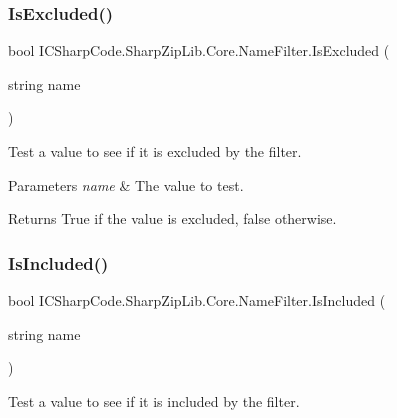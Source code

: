 \subsubsection{\texorpdfstring{Is\+Excluded()}{IsExcluded()}}
{\footnotesize\ttfamily bool I\+C\+Sharp\+Code.\+Sharp\+Zip\+Lib.\+Core.\+Name\+Filter.\+Is\+Excluded (\begin{DoxyParamCaption}\item[{string}]{name }\end{DoxyParamCaption})\hspace{0.3cm}{\ttfamily [inline]}}



Test a value to see if it is excluded by the filter. 


\begin{DoxyParams}{Parameters}
{\em name} & The value to test.\\
\hline
\end{DoxyParams}
\begin{DoxyReturn}{Returns}
True if the value is excluded, false otherwise.
\end{DoxyReturn}
\mbox{\label{class_i_c_sharp_code_1_1_sharp_zip_lib_1_1_core_1_1_name_filter_aa2a8ceae045d15b348529542eece8b32}} 
\subsubsection{\texorpdfstring{Is\+Included()}{IsIncluded()}}
{\footnotesize\ttfamily bool I\+C\+Sharp\+Code.\+Sharp\+Zip\+Lib.\+Core.\+Name\+Filter.\+Is\+Included (\begin{DoxyParamCaption}\item[{string}]{name }\end{DoxyParamCaption})\hspace{0.3cm}{\ttfamily [inline]}}



Test a value to see if it is included by the filter. 


